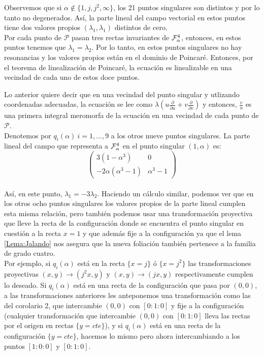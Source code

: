 Observemos que si $\alpha\notin\{1,j,j^{2},\infty \}$, los 21 puntos singulares son distintos y por lo tanto no degenerados. Así, la parte lineal del campo vectorial en estos puntos tiene dos valores propios $(\lambda_{1},\lambda_{1})$ distintos de cero.\\

Por cada punto de $\mathcal{P}$ pasan tres rectas invariantes de $\Fol[4]{\alpha}$, entonces, en estos puntos tenemos que $\lambda_{1} = \lambda_{2}$. Por lo tanto, en estos puntos singulares no hay resonancias y los valores propios están en el dominio de Poincaré. Entonces, por el teorema de linealización de Poincaré, la ecuación es linealizable en una vecindad de cada uno de estos doce puntos.

Lo anterior quiere decir que en una vecindad del punto singular y utlizando coordenadas adecuadas, la ecuación se lee como $ \lambda (u \frac{\partial}{\partial u} + v \frac{\partial}{\partial v})$ y entonces, $\frac{v}{u}$ es una primera integral meromorfa de la ecuación en una vecindad de cada punto de $\mathcal{P}$.
\\

Denotemos por $q_{i}(\alpha) \ i=1,...,9$ a los otros nueve puntos singulares. La parte lineal del campo que representa a $\Fol[4]{\alpha}$  en el punto singular $(1,\alpha )$ es:
\\

$$\begin{pmatrix}

3(1-\alpha^{3}) & 0 \\
-2\alpha(\alpha^{3}-1) & \alpha^{3} -1

\end{pmatrix}$$
\\

\noindent Así, en este punto, $\lambda_{1} = -3\lambda_{2}$. Haciendo un cálculo similar, podemos ver que en los otros ocho puntos singulares los valores propios de la parte lineal cumplen esta misma relación, pero también podemos usar una transformación proyectiva que lleve la recta de la configuración donde se encuentra el punto singular en cuestión a la recta $x=1$ y que además fije a la configuración  ya que el lema \ref{Lema:Jalando} nos asegura que la nueva foliación también pertenece a la familia de grado cuatro.
\\

Por ejemplo, si $q_{i}(\alpha)$ está en la recta $\{ x = j \}$ ó $\{ x = j^{2} \}$ las transformaciones proyectivas $(x,y) \rightarrow (j^{2}x,y)$ y $(x,y) \rightarrow (jx,y)$ respectivamente cumplen lo deseado. Si $q_{i}(\alpha)$ está en una recta de la configuración que pasa por $(0,0)$, a las transformaciones anteriores les anteponemos una transformación como las del corolario 2, que intercambie $(0,0)$ con $[0:1:0]$ y fije a la configuración (cualquier transformación que intercambie $(0,0)$ con $[0:1:0]$ lleva las rectas por el origen en rectas $\{y=cte\}$), y si $q_{i}(\alpha)$ está en una recta de la configuración $\{ y = cte \}$, hacemos lo mismo pero ahora intercambiando a los puntos $[1:0:0]$ y $[0:1:0]$.
\\

